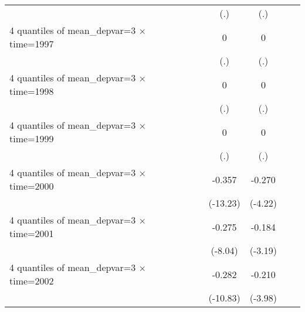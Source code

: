 \begin{table}[htbp]
\begin{tabular}{l*{6}{c}}
                    &                     &                     &         (.)         &         (.)         &                     &                     \\
[1em]
4 quantiles of mean\_depvar=3 $\times$ time=1997&                     &                     &           0         &           0         &                     &                     \\
                    &                     &                     &         (.)         &         (.)         &                     &                     \\
[1em]
4 quantiles of mean\_depvar=3 $\times$ time=1998&                     &                     &           0         &           0         &                     &                     \\
                    &                     &                     &         (.)         &         (.)         &                     &                     \\
[1em]
4 quantiles of mean\_depvar=3 $\times$ time=1999&                     &                     &           0         &           0         &                     &                     \\
                    &                     &                     &         (.)         &         (.)         &                     &                     \\
[1em]
4 quantiles of mean\_depvar=3 $\times$ time=2000&                     &                     &      -0.357\sym{***}&      -0.270\sym{***}&                     &                     \\
                    &                     &                     &    (-13.23)         &     (-4.22)         &                     &                     \\
[1em]
4 quantiles of mean\_depvar=3 $\times$ time=2001&                     &                     &      -0.275\sym{***}&      -0.184\sym{***}&                     &                     \\
                    &                     &                     &     (-8.04)         &     (-3.19)         &                     &                     \\
[1em]
4 quantiles of mean\_depvar=3 $\times$ time=2002&                     &                     &      -0.282\sym{***}&      -0.210\sym{***}&                     &                     \\
                    &                     &                     &    (-10.83)         &     (-3.98)         &                     &                     \\

\end{tabular}
\end{table}

